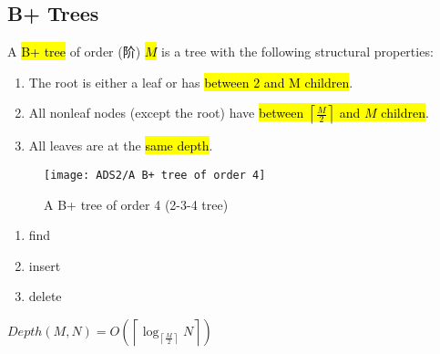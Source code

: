 \subsection{B+ Trees}
\begin{definition}
    A \hl{B+ tree} of order (阶) \hl{$M$} is a tree with the following structural properties: 
    \begin{enumerate}
        \item The root is either a leaf or has \hl{between 2 and M children}. 
        \item All nonleaf nodes (except the root) have \hl{between $\left \lceil \frac{M}{2} \right \rceil $ and $M$ children}. 
        \item All leaves are at the \hl{same depth}. 
    \end{enumerate}
\end{definition}

\begin{figure}[H]
    \centering
    \texttt{[image: ADS2/A B+ tree of order 4]}
    \caption{A B+ tree of order 4 (2-3-4 tree)}
\end{figure}

\begin{enumerate}
    \item find
    \item insert
    \item delete
\end{enumerate}

$Depth(M,N)=O(\left \lceil \log_{\left \lceil  \frac{M}{2} \right \rceil} N \right \rceil)$